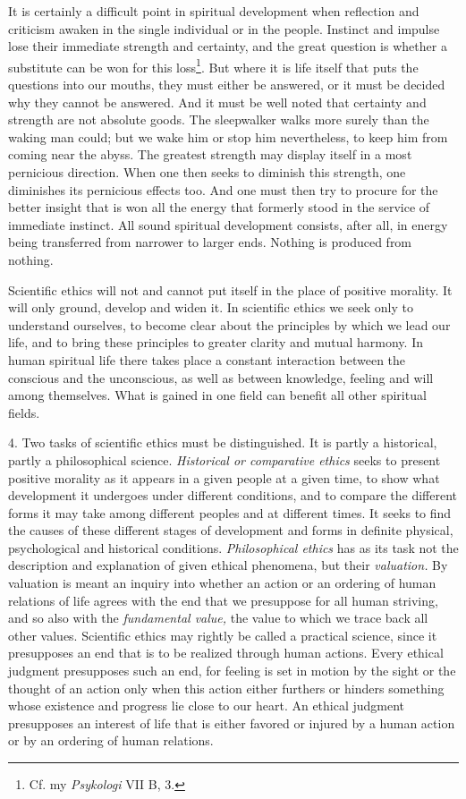 \documentclass[12pt,a4paper,openany]{book}
\newcommand{\opage}[1]{\marginnote{\footnotesize\textit{[#1]}}}
\begin{document}
It is certainly a difficult point in spiritual development when reflection and criticism awaken in
the single individual or in the people. Instinct and impulse lose their immediate strength and
certainty, and the great question is whether a substitute can be won for this
loss\footnote[1]{Cf. my \textit{Psykologi} VII B, 3.}. But where it is life itself that puts the
questions into our mouths, they must either be answered, or it must be decided why they cannot be
answered. And it must be well noted that certainty and strength are not absolute goods. The
sleepwalker walks more surely than the waking man could; but we wake him or stop him nevertheless,
to keep him from coming near the abyss. The greatest strength may display itself in a most
pernicious direction. When one then seeks to diminish this strength, one diminishes its pernicious
effects too. And one must then try to procure for the better insight that is won all the energy
that formerly stood in the service of immediate instinct. All sound spiritual development
consists, after all, in energy being transferred from narrower to larger ends. Nothing is produced
from nothing.

\opage{9}Scientific ethics will not and cannot put itself in the place of positive morality. It will
only ground, develop and widen it. In scientific ethics we seek only to understand ourselves, to
become clear about the principles by which we lead our life, and to bring these principles to
greater clarity and mutual harmony. In human spiritual life there takes place a constant
interaction between the conscious and the unconscious, as well as between knowledge, feeling and
will among themselves. What is gained in one field can benefit all other spiritual fields.

4. Two tasks of scientific ethics must be distinguished. It is partly a historical, partly a
philosophical science. \textit{Historical or comparative ethics} seeks to present positive morality as
it appears in a given people at a given time, to show what development it undergoes under
different conditions, and to compare the different forms it may take among different peoples and
at different times. It seeks to find the causes of these different stages of development and forms
in definite physical, psychological and historical conditions. \textit{Philosophical ethics} has as
its task not the description and explanation of given ethical phenomena, but their
\textit{valuation.} By valuation is meant an inquiry into whether an action or an ordering of human
relations of life agrees with the end that we presuppose for all human striving, and so also with
the \textit{fundamental value,} the value to which we trace back all other values. Scientific ethics
may rightly be called a practical science, since it presupposes an end that is to be realized
through human actions. Every ethical judgment presupposes such an end, for feeling is set in motion
by the sight or the thought of an action only when this action either furthers or hinders something
whose existence and progress lie close to our heart. An ethical judgment presupposes an interest of
life that is either favored or injured by a human action or by an ordering of human relations.
\end{document}
